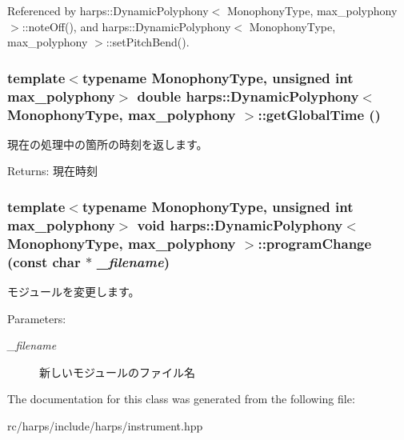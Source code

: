 Referenced by harps::DynamicPolyphony$<$ MonophonyType, max\_\-polyphony $>$::noteOff(), and harps::DynamicPolyphony$<$ MonophonyType, max\_\-polyphony $>$::setPitchBend().
\subsubsection[getGlobalTime]{\setlength{\rightskip}{0pt plus 5cm}template$<$typename MonophonyType, unsigned int max\_\-polyphony$>$ double {\bf harps::DynamicPolyphony}$<$ MonophonyType, max\_\-polyphony $>$::getGlobalTime ()\hspace{0.3cm}{\tt  [inline]}}\label{classharps_1_1DynamicPolyphony_04c6b1c548270bc160e7a96e6ecc034d}


現在の処理中の箇所の時刻を返します。 \begin{Desc}
\item[Returns:]現在時刻 \end{Desc}
\subsubsection[programChange]{\setlength{\rightskip}{0pt plus 5cm}template$<$typename MonophonyType, unsigned int max\_\-polyphony$>$ void {\bf harps::DynamicPolyphony}$<$ MonophonyType, max\_\-polyphony $>$::programChange (const char $\ast$ {\em \_\-filename})\hspace{0.3cm}{\tt  [inline]}}\label{classharps_1_1DynamicPolyphony_1223aecd5a7ee1bcbf22904cb555ab50}


モジュールを変更します。 \begin{Desc}
\item[Parameters:]
\begin{description}
\item[{\em \_\-filename}]新しいモジュールのファイル名 \end{description}
\end{Desc}


The documentation for this class was generated from the following file:\begin{CompactItemize}
\item 
rc/harps/include/harps/instrument.hpp\end{CompactItemize}
